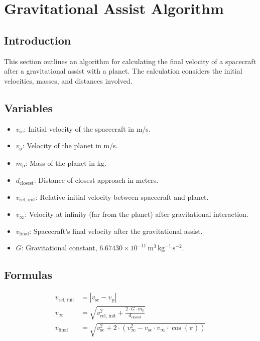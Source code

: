 \section{Gravitational Assist Algorithm}

\subsection{Introduction}
This section outlines an algorithm for calculating the final velocity of a spacecraft after a gravitational assist with a planet. The calculation considers the initial velocities, masses, and distances involved.

\subsection{Variables}
\begin{itemize}
    \item $v_{\text{sc}}$: Initial velocity of the spacecraft in m/s.
    \item $v_{\text{p}}$: Velocity of the planet in m/s.
    \item $m_{\text{p}}$: Mass of the planet in kg.
    \item $d_{\text{closest}}$: Distance of closest approach in meters.
    \item $v_{\text{rel, init}}$: Relative initial velocity between spacecraft and planet.
    \item $v_{\infty}$: Velocity at infinity (far from the planet) after gravitational interaction.
    \item $v_{\text{final}}$: Spacecraft's final velocity after the gravitational assist.
    \item $G$: Gravitational constant, $6.67430 \times 10^{-11} \, \text{m}^3 \, \text{kg}^{-1} \, \text{s}^{-2}$.
\end{itemize}

\subsection{Formulas}
\begin{align*}
    v_{\text{rel, init}} &= |v_{\text{sc}} - v_{\text{p}}| \\
    v_{\infty} &= \sqrt{v_{\text{rel, init}}^2 + \frac{2 \cdot G \cdot m_{\text{p}}}{d_{\text{closest}}}} \\
    v_{\text{final}} &= \sqrt{v_{\text{sc}}^2 + 2 \cdot (v_{\infty}^2 - v_{\text{sc}} \cdot v_{\infty} \cdot \cos(\pi))}
\end{align*}